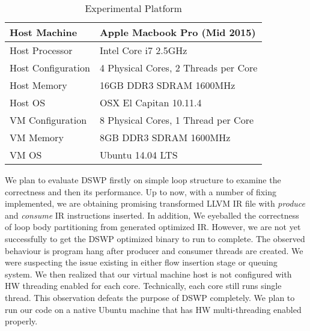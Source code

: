 \documentclass[letterpaper, 10 pt, conference]{ieeeconf}  %
\begin{document}
\begin{table}[h]
\caption{Experimental Platform}
\label{table1}
\begin{center}
\begin{tabular}{|l||l|}
\hline
Host Machine & Apple Macbook Pro (Mid 2015)\\
\hline
Host Processor & Intel Core i7 2.5GHz\\
\hline
Host Configuration & 4 Physical Cores, 2 Threads per Core\\
\hline
Host Memory & 16GB DDR3 SDRAM 1600MHz\\
\hline
Host OS & OSX El Capitan 10.11.4\\
\hline
VM Configuration & 8 Physical Cores, 1 Thread per Core\\
\hline
VM Memory & 8GB DDR3 SDRAM 1600MHz\\
\hline
VM OS & Ubuntu 14.04 LTS\\
\hline
\end{tabular}
\end{center}
\end{table}

We plan to evaluate DSWP firstly on simple loop structure to examine the correctness and then its performance. Up to now, with a number of fixing implemented, we are obtaining promising transformed LLVM IR file with \textit{produce} and \textit{consume} IR instructions inserted. In addition, We eyeballed the correctness of loop body partitioning from generated optimized IR. However, we are not yet successfully to get the DSWP optimized binary to run to complete. The observed behaviour is program hang after producer and consumer threads are created. We were suspecting the issue existing in either flow insertion stage or queuing system. We then realized that our virtual machine host is not configured with HW threading enabled for each core. Technically, each core still runs single thread. This observation defeats the purpose of DSWP completely. We plan to run our code on a native Ubuntu machine that has HW multi-threading enabled properly. 

\end{document}
